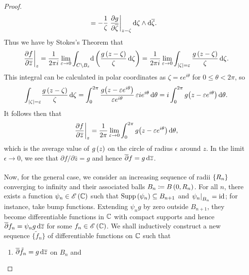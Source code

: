 \documentclass[../Moduli_Spaces_of_Riemann_Surfaces.tex]{subfiles}
\begin{document}
\begin{proof}
\begin{equation*}
\begin{aligned}
                   &=-\frac{1}{\zeta}\left.\frac{\partial g}{\partial\overline{\zeta}}\right|_{z-\zeta}\mathrm{d}\zeta\wedge\mathrm{d}\overline{\zeta}.
            \end{aligned}
        \end{equation*}
        Thus we have by Stokes's Theorem that
        \begin{equation*}
            \left.\frac{\partial f}{\partial\overline{z}}\right|_z=\frac{1}{2\pi i}\lim\limits_{\varepsilon\to0}\int_{C\setminus B_\varepsilon}\!\mathrm{d}\left(\frac{g\left(z-\zeta\right)}{\zeta}\,\mathrm{d}\zeta\right)=\frac{1}{2\pi i}\lim\limits_{\varepsilon\to0}\int_{\left|\zeta\right|=\varepsilon}\frac{g\left(z-\zeta\right)}{\zeta}\,\mathrm{d}\zeta.
        \end{equation*}
        This integral can be calculated in polar coordinates as $\zeta=\epsilon e^{i\theta}$ for $0\leq\theta<2\pi$, so
        \begin{equation*}
            \int_{\left|\zeta\right|=\varepsilon}\!\frac{g\left(z-\zeta\right)}{\zeta}\,\mathrm{d}\zeta=\int_{0}^{2\pi}\frac{g\big(z-\varepsilon e^{i\theta}\big)}{\varepsilon e^{i\theta}}\,\varepsilon ie^{i\theta}\,\mathrm{d}\theta=i\int_{0}^{2\pi}g\big(z-\varepsilon e^{i\theta}\big)\,\mathrm{d}\theta.
        \end{equation*}
        It follows then that
        \begin{equation*}
            \left.\frac{\partial f}{\partial\overline{z}}\right|_z=\frac{1}{2\pi}\lim\limits_{\varepsilon\to0}\int_{0}^{2\pi}g\big(z-\varepsilon e^{i\theta}\big)\,\mathrm{d}\theta,
        \end{equation*}
        which is the average value of $g\left(z\right)$ on the circle of radius $\epsilon$ around $z$. In the limit $\epsilon\to0$, we see that $\partial f/\partial\bar{z}=g$ and hence $\overline{\partial}f=g\,\mathrm{d}\overline{z}$.\\\ \\
        Now, for the general case, we consider an increasing sequence of radii $\left\{R_n\right\}$ converging to infinity and their associated balls $B_n\coloneqq B\left(0,R_n\right)$. For all $n$, there exists a function $\psi_n\in\mathscr{E}\left(\mathbb{C}\right)$ such that $\operatorname{Supp}\left(\psi_n\right)\subseteq B_{n+1}$ and $\left.\psi_n\right|_{B_n}=\operatorname{id}$; for instance, take bump functions. Extending $\psi_ng$ by zero outside $B_{n+1}$, they become differentiable functions in $\mathbb{C}$ with compact supports and hence $\overline{\partial}f_n=\psi_ng\,\mathrm{d}\overline{z}$ for some $f_n\in\mathscr{E}\left(\mathbb{C}\right)$. We shall inductively construct a new sequence $\big\{\tilde{f}_n\big\}$ of differentiable functions on $\mathbb{C}$ such that
        \begin{enumerate}
            \item $\overline{\partial}\tilde{f}_n=g\,\mathrm{d}\overline{z}$ on $B_n$ and

\end{enumerate}
\end{proof}
\end{document}
